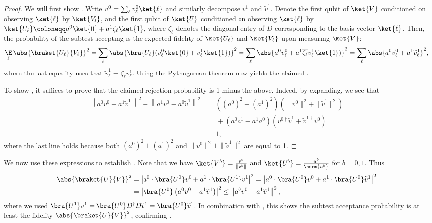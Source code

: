 \begin{proof}
We will first show . Write $v^0= \sum_\ell v^0_\ell \ket{\ell}$ and similarly decompose $v^1$ and $\widetilde{v}^1$. Denote the first qubit of $\ket{V}$ conditioned on observing $\ket{\ell}$ by $ \ket{V_\ell}$, and the first qubit of $\ket{U}$ conditioned on observing $\ket{\ell}$ by $ \ket{U_\ell} \coloneqq a^0\ket{0} + a^1\zeta_\ell \ket{1}$, where $\zeta_\ell$ denotes the diagonal entry of $D$ corresponding to the basis vector $\ket{\ell}$. Then, the probability of the subtest  accepting is the expected fidelity of $\ket{U_\ell}$ and $\ket{V_\ell}$ upon measuring $\ket{V}$:
\[
     \mathop{\E}_\ell \abs{ \braket{U_\ell}{V_\ell} }^2 = \sum_\ell \abs{ \bra{U_\ell}(v^0_\ell\ket{0} + v^1_\ell\ket{1}) }^2 = \sum_\ell \abs{ a^0v^0_\ell + a^1 \overline{\zeta_\ell} v^1_\ell\ket{1}) }^2 =  \sum_\ell \abs{ a^0v^0_\ell + a^1 \widetilde{v}^1_\ell }^2,
\]
where the last equality uses that $\widetilde{v}^1_\ell = \overline{\zeta_\ell}v^1_\ell$. Using the Pythagorean theorem now yields the claimed .

To show , it suffices to prove that the claimed rejection probability is 1 minus the above. Indeed, by expanding, we see that
\begin{align*}
    \left\|a^0 v^0 + a^1 \widetilde{v}^1\right\|^2 + \left\|a^1 v^0 - a^0 \widetilde{v}^1\right\|^2 &= \left( (a^0)^2+(a^1)^2 \right) \left( \| v^0 \|^2 + \| \widetilde{v}^1 \|^2 \right) \\
    &\quad~~ + \left( a^0a^1-a^1a^0 \right) \left( v^{0\dag} \widetilde{v}^1 + \widetilde{v}^{1\dag} v^0 \right)\\
    &= 1,
\end{align*}
where the last line holds because both $(a^0)^2+(a^1)^2$ and $\| v^0 \|^2 + \| \widetilde{v}^1 \|^2$ are equal to 1.
\end{proof}

    We now use these expressions to establish . Note that we have $\ket{V^b} = \frac{v^b}{\|v^b\|}$ and $\ket{U^b} = \frac{u^b}{\norm{u^b}}$ for $b = 0, 1$.
    Thus
    \begin{align*}
        \abs{\braket{U}{V}}^2 
        &= \left|a^0\cdot \bra{U^0}v^0 + a^1\cdot \bra{U^1}v^1\right|^2 
        = \left|a^0\cdot \bra{U^0}v^0 + a^1\cdot \bra{U^0}\widetilde{v}^1\right|^2\\
        &= \left|\bra{U^0}\left(a^0 v^0 + a^1 \widetilde{v}^1\right)\right|^2
        \leq \left\|a^0 v^0+a^1 \widetilde{v}^1\right\|^2, \label{eqn:expre}
    \end{align*}
    where we used $\bra{U^1}v^1 = \bra{U^0}D^\dagger D \widetilde{v}^1 = \bra{U^0}\widetilde{v}^1$.
    In combination with , this shows the subtest acceptance probability is at least the fidelity $\abs{\braket{U}{V}}^2$, confirming . 
    
